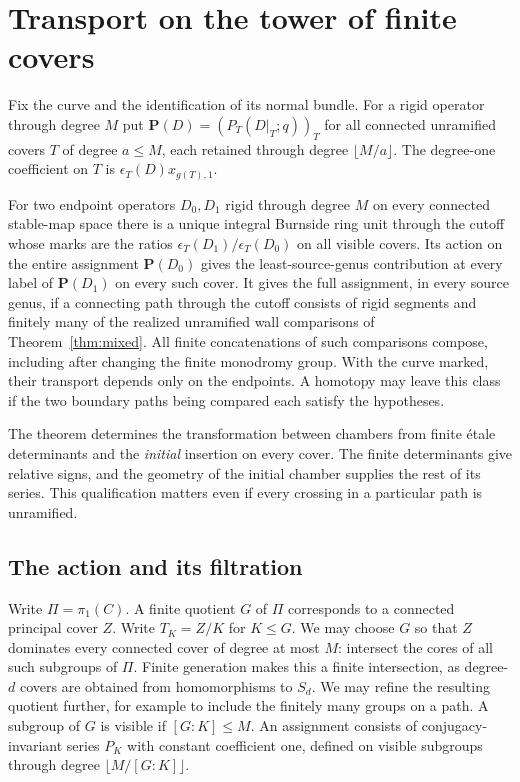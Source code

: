\section{Transport on the tower of finite covers}\label{sec:endpoints}
Fix the curve and the identification of its normal bundle. For a rigid
operator through degree $M$ put $\mathbf P(D)=(P_T(D|_T;q))_T$ for
all connected unramified covers $T$ of degree $a\le M$, each retained
through degree $\lfloor M/a\rfloor$. The degree-one coefficient on $T$
is $\epsilon_T(D)x_{g(T),1}$.
\begin{theorem}\label{thm:endpoints} For two endpoint operators $D_0,D_1$ rigid through degree $M$ on every connected stable-map space there is a unique integral Burnside ring unit through the cutoff whose marks are the ratios $\epsilon_T(D_1)/\epsilon_T(D_0)$ on all visible covers. Its action on the entire assignment $\mathbf P(D_0)$ gives the least-source-genus contribution at every label of $\mathbf P(D_1)$ on every such cover. It gives the full assignment, in every source genus, if a connecting path through the cutoff consists of rigid segments and finitely many of the realized unramified wall comparisons of Theorem~\ref{thm:mixed}. All finite concatenations of such comparisons compose, including after changing the finite monodromy group. With the curve marked, their transport depends only on the endpoints. A homotopy may leave this class if the two boundary paths being compared each satisfy the hypotheses.

\end{theorem}

The theorem determines the transformation between chambers from finite étale determinants and the \emph{initial} insertion on every cover. The finite determinants give relative signs, and the geometry of the initial chamber supplies the rest of its series. This qualification matters even if every crossing in a particular path is unramified.

\subsection{The action and its filtration}

Write \(\Pi=\pi_1(C)\). A finite quotient \(G\) of \(\Pi\) corresponds to a connected principal cover \(Z\). Write \(T_K=Z/K\) for \(K\le G\). We may choose \(G\) so that \(Z\) dominates every connected cover of degree at most \(M\): intersect the cores of all such subgroups of \(\Pi\). Finite generation makes this a finite intersection, as degree-\(d\) covers are obtained from homomorphisms to \(S_d\). We may refine the resulting quotient further, for example to include the finitely many groups on a path. A subgroup of \(G\) is visible if \([G:K]\le M\). An assignment consists of conjugacy-invariant series \(P_K\) with constant coefficient one, defined on visible subgroups through degree \(\lfloor M/[G:K]\rfloor\).

